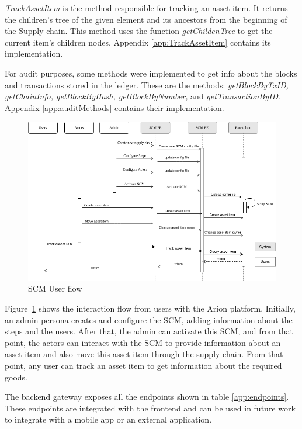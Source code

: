 \textit{TrackAssetItem} is the method responsible for tracking an asset item. It returns the children's tree of the given element and its ancestors from the beginning of the Supply chain. This method uses the function \textit{getChildenTree} to get the current item's children nodes. Appendix \ref{app:TrackAssetItem} contains its implementation.

For audit purposes, some methods were implemented to get info about the blocks and transactions stored in the ledger. These are the methods: \textit{getBlockByTxID, getChainInfo, getBlockByHash, getBlockByNumber,} and \textit{getTransactionByID}. Appendix \ref{app:auditMethods} contains their implementation.

\begin{figure}[ht]
\begin{center}
  \includegraphics[scale=0.5]{images/SequenceDiagram.png}
\caption{SCM User flow}
\label{fig:sequenceDiagram}
\end{center}
\end{figure}

Figure~\ref{fig:sequenceDiagram} shows the interaction flow from users with the Arion platform. Initially, an admin persona creates and configure the SCM, adding information about the steps and the users. After that, the admin can activate this SCM, and from that point, the actors can interact with the SCM to provide information about an asset item and also move this asset item through the supply chain. From that point, any user can track an asset item to get information about the required goods.

The backend gateway exposes all the endpoints shown in table \ref{app:endpoints}. These endpoints are integrated with the frontend and can be used in future work to integrate with a mobile app or an external application.


